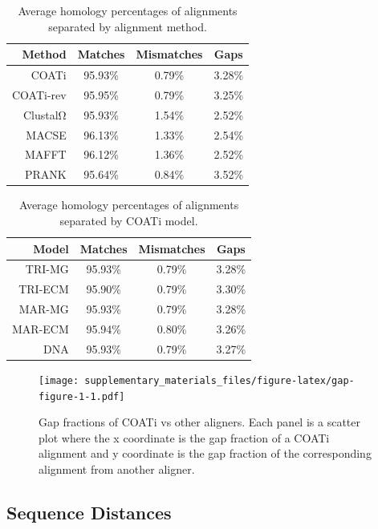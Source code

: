 \documentclass[
]{article}
\begin{document}
\begin{table}[H]
\centering
\caption{\label{tab:gap-table-5}Average homology percentages of alignments separated by alignment method.}
\centering
\begin{tabular}[t]{rccc}
\toprule
Method & Matches & Mismatches & Gaps\\
\midrule
COATi & 95.93\% & 0.79\% & 3.28\%\\
\addlinespace
COATi-rev & 95.95\% & 0.79\% & 3.25\%\\
\addlinespace
ClustalΩ & 95.93\% & 1.54\% & 2.52\%\\
\addlinespace
MACSE & 96.13\% & 1.33\% & 2.54\%\\
\addlinespace
MAFFT & 96.12\% & 1.36\% & 2.52\%\\
\addlinespace
PRANK & 95.64\% & 0.84\% & 3.52\%\\
\bottomrule
\end{tabular}
\end{table}

\begin{table}[H]
\centering
\caption{\label{tab:gap-table-6}Average homology percentages of alignments separated by COATi model.}
\centering
\begin{tabular}[t]{rccc}
\toprule
Model & Matches & Mismatches & Gaps\\
\midrule
TRI-MG & 95.93\% & 0.79\% & 3.28\%\\
\addlinespace
TRI-ECM & 95.90\% & 0.79\% & 3.30\%\\
\addlinespace
MAR-MG & 95.93\% & 0.79\% & 3.28\%\\
\addlinespace
MAR-ECM & 95.94\% & 0.80\% & 3.26\%\\
\addlinespace
DNA & 95.93\% & 0.79\% & 3.27\%\\
\bottomrule
\end{tabular}
\end{table}

\begin{figure}
\centering
\texttt{[image: supplementary\_materials\_files/figure-latex/gap-figure-1-1.pdf]}
\caption{\label{fig:gap-figure-1}Gap fractions of COATi vs other aligners. Each panel is a scatter plot where the x coordinate is the gap fraction of a COATi alignment and y coordinate is the gap fraction of the corresponding alignment from another aligner.}
\end{figure}

\newpage

\subsection{Sequence Distances}\label{sequence-distances}
\end{document}
